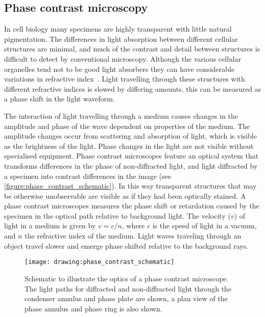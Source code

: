 \subsection{Phase contrast microscopy}
\label{introduction:microscopy:phase_contrast_microscopy}
In cell biology many specimens are highly transparent with little natural pigmentation. The differences in light absorption between different cellular structures are minimal, and much of the contrast and detail between structures is difficult to detect by conventional microscopy. Although the various cellular organelles tend not to be good light absorbers they can have considerable variations in refractive index~\cite{Murphy2012}. Light travelling through these structures with different refractive indices is slowed by differing amounts, this can be measured as a phase shift in the light waveform.

The interaction of light travelling through a medium causes changes in the amplitude and phase of the wave dependent on properties of the medium. The amplitude changes occur from scattering and absorption of light, which is visible as the brightness of the light. Phase changes in the light are not visible without specialised equipment. Phase contrast microscopes feature an optical system that transforms differences in the phase of non-diffracted light, and light diffracted by a specimen into contrast differences in the image (see \autoref{figure:phase_contrast_schematic}). In this way transparent structures that may be otherwise unobservable are visible as if they had been optically stained. A phase contrast microscopes measures the phase shift or retardation caused by the specimen in the optical path relative to background light. The velocity ($v$) of light in a medium is given by  $v=c/n$, where $c$ is the speed of light in a vacuum, and $n$ the refractive index of the medium. Light waves traveling through an object travel slower and emerge phase shifted relative to the background rays.

\begin{figure}[htbp!]
	\centering
	\texttt{[image: drawing:phase\_contrast\_schematic]}
	\caption[Schematic of phase contrast microscopy optics]{Schematic to illustrate the optics of a phase contrast microscope. The light paths for diffracted and non-diffracted light through the condenser annulus and phase plate are shown, a plan view of the phase annulus and phase ring is also shown.}
	\label{figure:phase_contrast_schematic}
\end{figure}


